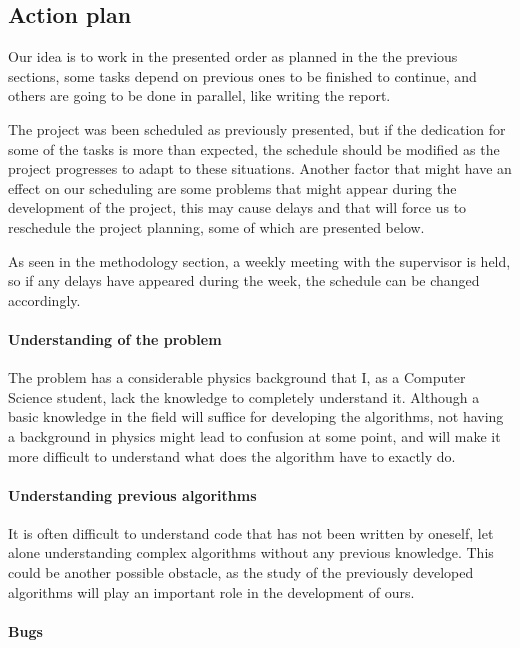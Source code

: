 
\subsection{Action plan}

Our idea is to work in the presented order as planned in the the previous sections, some tasks depend on previous ones to be finished to continue, and others are going to be done in parallel, like writing the report.

The project was been scheduled as previously presented, but if the dedication for some of the tasks is more than expected, the schedule should be modified as the project progresses to adapt to these situations. Another factor that might have an effect on our scheduling are some problems that might appear during the development of the project, this may cause delays and that will force us to reschedule the project planning, some of which are presented below.

As seen in the methodology section, a weekly meeting with the supervisor is held, so if any delays have appeared during the week, the schedule can be changed accordingly.

\paragraph{Understanding of the problem}

The problem has a considerable physics background that I, as a Computer Science student, lack the knowledge to completely understand it. Although a basic knowledge in the field will suffice for developing the algorithms, not having a background in physics might lead to confusion at some point, and will make it more difficult to understand what does the algorithm have to exactly do.

\paragraph{Understanding previous algorithms}

It is often difficult to understand code that has not been written by oneself, let alone understanding complex algorithms without any previous knowledge. This could be another possible obstacle, as the study of the previously developed algorithms will play an important role in the development of ours.

\paragraph{Bugs}

